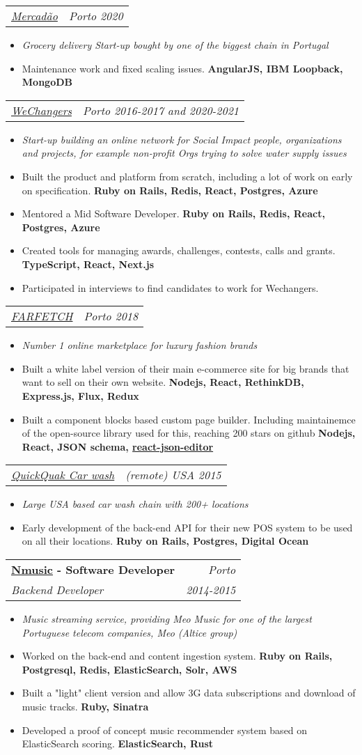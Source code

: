 \documentclass[11pt]{article}
\makeatletter
\newcommand{\resumeItem}[1]{%
  \item\small{
    #1
  }
}
\newcommand{\resumeItemSub}[1]{%
  \item[--]\small\textit{#1}
}
\newcommand{\sepsection}{\vspace{16pt}}
\newcommand{\resumeSubheading}[4]{
  \vspace{12pt}\item%
    \begin{tabular*}{0.97\textwidth}[t]{l@{\extracolsep{\fill}}r}
      \textbf{#1} & \textit{\small \color{gray} #2} \\
      \textit{\small #3} & \textit{\color{gray} \small #4} \\
    \end{tabular*}\vspace{-5pt}
}
\newcommand{\resumeSubSubheading}[2]{
    \vspace{12pt}
    \begin{tabular*}{0.97\textwidth}{l@{\extracolsep{\fill}}r}
      \textit{\small#1} & \textit{\color{gray} \small #2} \\
    \end{tabular*}\vspace{-5pt}
}
\newcommand{\resumeItemListStart}{\begin{itemize}}
\newcommand{\resumeItemListEnd}{\end{itemize}\vspace{-5pt}}
\makeatother
\begin{document}
      \resumeSubSubheading{\href{https://mercadao.pt}{Mercadão}}{Porto 2020}
      \resumeItemListStart
        \resumeItemSub{Grocery delivery Start-up bought by one of the biggest chain in Portugal}
        \resumeItem{Maintenance work and fixed scaling issues. \textbf{AngularJS, IBM Loopback, MongoDB}}
      \resumeItemListEnd

      \resumeSubSubheading
      {\href{https://wechangers.org}{WeChangers}}{Porto 2016-2017 and 2020-2021}
      \resumeItemListStart
        \resumeItemSub{Start-up building an online network for Social Impact people, organizations and projects, for example non-profit Orgs trying to solve water supply issues}
        \resumeItem{Built the product and platform from scratch, including a lot of work on early on specification. \textbf{Ruby on Rails, Redis, React, Postgres, Azure}}
        \resumeItem{Mentored a Mid Software Developer. \textbf{Ruby on Rails, Redis, React, Postgres, Azure}}
        \resumeItem{Created tools for managing awards, challenges, contests, calls and grants. \textbf{TypeScript, React, Next.js}}
        \resumeItem{Participated in interviews to find candidates to work for Wechangers.}
      \resumeItemListEnd
      
      \resumeSubSubheading
      {\href{https://farfetch.com/}{FARFETCH}}{Porto 2018}
      \resumeItemListStart
        \resumeItemSub{Number 1 online marketplace for luxury fashion brands}
        \resumeItem{Built a white label version of their main e-commerce site for big brands that want to sell on their own website. \textbf{Nodejs, React, RethinkDB, Express.js, Flux, Redux}}
        \resumeItem{Built a component blocks based custom page builder. Including maintainemce of the open-source library used for this, reaching 200 stars on github \textbf{Nodejs, React, JSON schema, \href{https://github.com/ismaelga/react-json-editor}{react-json-editor}}}
      \resumeItemListEnd

       

      \resumeSubSubheading
      {\href{https://www.dontdrivedirty.com}{QuickQuak Car wash}}{(remote) USA 2015}
      \resumeItemListStart
        \resumeItemSub{Large USA based car wash chain with 200+ locations}
        \resumeItem{Early development of the back-end API for their new POS system to be used on all their locations. \textbf{Ruby on Rails, Postgres, Digital Ocean}}
      \resumeItemListEnd

\sepsection

\resumeSubheading
      {\href{https://web.archive.org/web/20190811141419/http://www.nmusic.pt/}{Nmusic} - Software Developer}{Porto}
      {Backend Developer}{2014-2015}
      \resumeItemListStart
      \resumeItemSub{Music streaming service, providing Meo Music for one of the largest Portuguese telecom companies, Meo (Altice group)}
      \resumeItem{Worked on the back-end and content ingestion system. \textbf{Ruby on Rails,  Postgresql, Redis, ElasticSearch, Solr, AWS}}
      \resumeItem{Built a "light" client version and allow 3G data subscriptions and download of music tracks. \textbf{Ruby, Sinatra}}
      \resumeItem{Developed a proof of concept music recommender system based on ElasticSearch scoring. \textbf{ElasticSearch, Rust}}
      \resumeItemListEnd
\end{document}
